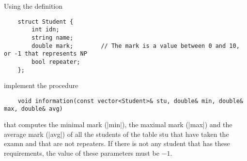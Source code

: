 
\Statement

Using the definition

\begin{lstlisting}
    struct Student {
        int idn;
        string name;
        double mark;        // The mark is a value between 0 and 10, or -1 that represents NP
        bool repeater;
    };
\end{lstlisting}

implement the procedure

\begin{lstlisting}
    void information(const vector<Student>& stu, double& min, double& max, double& avg)
\end{lstlisting}

that computes the minimal mark (|min|), the maximal mark (|max|) and the
average mark (|avg|) of all the students of the table stu that have taken
the examn and that are not repeaters. If there is not any student that has
these requirements, the value of these parameters must be $-1$.

\ObservationNoMainTuples
